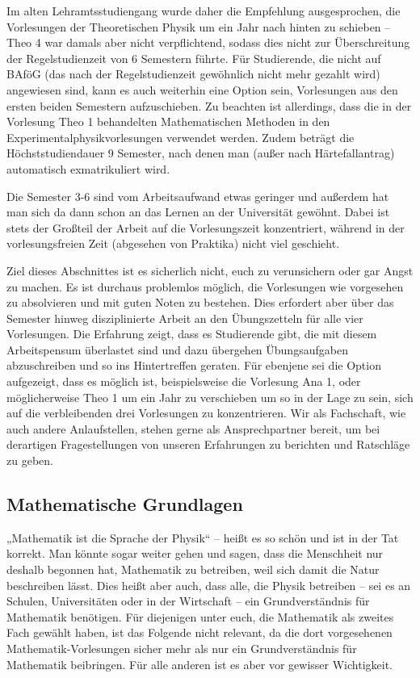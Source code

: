 Im alten Lehramtsstudiengang wurde daher die Empfehlung ausgesprochen, die Vorlesungen der Theoretischen Physik um ein Jahr nach hinten zu schieben -- Theo 4 war damals aber nicht verpflichtend, sodass dies nicht zur Überschreitung der Regelstudienzeit von 6 Semestern führte. Für Studierende, die nicht auf BAföG (das nach der Regelstudienzeit gewöhnlich nicht mehr gezahlt wird) angewiesen sind, kann es auch weiterhin eine Option sein, Vorlesungen aus den ersten beiden Semestern aufzuschieben. Zu beachten ist allerdings, dass die in der Vorlesung Theo 1 behandelten Mathematischen Methoden in den Experimentalphysikvorlesungen verwendet werden. Zudem beträgt die Höchststudiendauer 9 Semester, nach denen man (außer nach Härtefallantrag) automatisch exmatrikuliert wird.

Die Semester 3-6 sind vom Arbeitsaufwand etwas geringer und außerdem hat man sich da dann schon an das Lernen an der Universität gewöhnt. Dabei ist stets der Großteil der Arbeit auf die Vorlesungszeit konzentriert, während in der vorlesungsfreien Zeit (abgesehen von Praktika) nicht viel geschieht.

Ziel dieses Abschnittes ist es sicherlich nicht, euch zu verunsichern oder gar Angst zu machen. Es ist durchaus problemlos möglich, die Vorlesungen wie vorgesehen zu absolvieren und mit guten Noten zu bestehen. Dies erfordert aber über das Semester hinweg disziplinierte Arbeit an den Übungszetteln für alle vier Vorlesungen. Die Erfahrung zeigt, dass es Studierende gibt, die mit diesem Arbeitspensum überlastet sind und dazu übergehen Übungsaufgaben abzuschreiben und so ins Hintertreffen geraten. Für ebenjene sei die Option aufgezeigt, dass es möglich ist, beispielsweise die Vorlesung Ana 1, oder möglicherweise Theo 1 um ein Jahr zu verschieben um so in der Lage zu sein, sich auf die verbleibenden drei Vorlesungen zu konzentrieren. Wir als Fachschaft, wie auch andere Anlaufstellen, stehen gerne als Ansprechpartner bereit, um bei derartigen Fragestellungen von unseren Erfahrungen zu berichten und Ratschläge zu geben.

\subsection{Mathematische Grundlagen}

„Mathematik ist die Sprache der Physik“ -- heißt es so schön und ist in der Tat korrekt. Man könnte sogar weiter gehen und sagen, dass die Menschheit nur deshalb begonnen hat, Mathematik zu betreiben, weil sich damit die Natur beschreiben lässt. Dies heißt aber auch, dass alle, die Physik betreiben -- sei es an Schulen, Universitäten oder in der Wirtschaft -- ein Grundverständnis für Mathematik benötigen. Für diejenigen unter euch, die Mathematik als zweites Fach gewählt haben, ist das Folgende nicht relevant, da die dort vorgesehenen Mathematik-Vorlesungen sicher mehr als nur ein Grundverständnis für Mathematik beibringen. Für alle anderen ist es aber vor gewisser Wichtigkeit.

